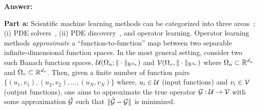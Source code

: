 {\bf Answer:}

{\bf Part a:} Scientific machine learning methods can be categorized into three areas~\citep{boulle2024mathematical}; (i) PDE solvers~\citep{raissi2019physics}, (ii) PDE discovery~\citep{brunton2016discovering}, and operator learning. Operator learning methods \emph{approximate} a ``function-to-function'' map between two separable infinite-dimensional function spaces. In the most general setting, consider two such Banach function spaces, $\mathcal{U}(\Omega_u; \|\cdot\|_{\mathbb{R}^{d_u}})$ and $\mathcal{V}(\Omega_v, \|\cdot\|_{\mathbb{R}^{d_v}})$ where $\Omega_u \subset \mathbb{R}^{d_u}$ and $\Omega_v \subset \mathbb{R}^{d_v}$. Then, given a finite number of function pairs $\{(u_1, v_1), (u_2, v_2), \dots, (u_N, v_N)\}$ where, $u_i \in \mathcal{U}$ (input functions) and $v_i \in \mathcal{V}$ (output functions), one aims to approximate the true operator $\mathcal{G}: \mathcal{U} \rightarrow \mathcal{V}$ with some approximation $\tilde{\mathcal{G}}$ such that $\|\tilde{\mathcal{G}} - \mathcal{G} \|$ is minimized.


